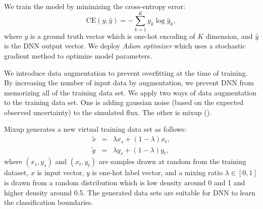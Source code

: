 \documentclass[useamsfonts]{pasj01}
\begin{document}
We train the model by minimizing the cross-entropy error: 
\begin{equation}
\mathrm{CE} \left(y, \hat{y} \right) =　-\sum_{k = 1}^K y_k \log \hat{y}_k,
\end{equation}
where $y$ is a ground truth vector which is one-hot encoding of $K$ dimension, and $\hat{y}$ is the DNN output vector.
We deploy {\it Adam optimizer} which uses a stochastic gradient method to optimize model parameters.

We introduce data augmentation to prevent overfitting at the time of training.
By increasing the number of input data by augmentation, we prevent DNN from memorizing all of the training data set.
We apply two ways of data augmentation to the training data set.
One is adding gaussian noise (based on the expected observed uncertainty) to the simulated flux.
The other is mixup (\cite{mixup}).

Mixup generates a new virtual training data set as follows:
\begin{eqnarray*}
    \tilde{x} &=& \lambda x_s + \left( 1-\lambda \right) x_t, \\
    \tilde{y} &=& \lambda y_s + \left( 1-\lambda \right) y_t,
\end{eqnarray*}
where $\left(x_s, y_s\right)$ and $\left(x_t, y_t\right)$ are samples drawn at random from the training dataset, $x$ is input vector, $y$ is one-hot label vector, 
and a mixing ratio $\lambda \in \left[0, 1\right]$ is drawn from a random distribution which is low density around 0 and 1 and higher density around 0.5. 
The generated data sets are suitable for DNN to learn the classification boundaries.
\end{document}
